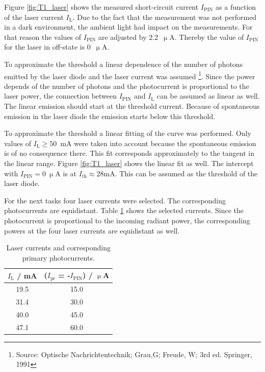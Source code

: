 Figure \ref{fig:T1_laser} shows the measured short-circuit current $I_{\mathrm{PIN}}$ as a function of the laser current $I_{\mathrm{L}}$. Due to the fact that the measurement was not performed in a dark environment, the ambient light had impact on the measurements. For that reason the values of $I_{\mathrm{PIN}}$ are adjusted by 2.2~$\upmu$A. Thereby the value of $I_{\mathrm{PIN}}$ for the laser in off-state is 0~$\upmu$A.

To approximate the threshold a linear dependence of the number of photons emitted by the laser diode and the laser current was assumed \footnote[1]{Source: Optische Nachrichtentechnik; Grau,G; Freude, W; 3rd ed. Springer, 1991}. Since the power depends of the number of photons and the photocurrent is proportional to the laser power, the connection between $I_{\mathrm{PIN}}$ and $I_{\mathrm{L}}$ can be assumed as linear as well. The linear emission should start at the threshold current. Because of spontaneous emission in the laser diode the emission starts below this threshold.

To approximate the threshold a linear fitting of the curve was performed. Only values of $I_{\mathrm{L}} \geq 50$~mA were taken into account because the spontaneous emission is of no consequence there. This fit corresponds approximately to the tangent in the linear range. Figure \ref{fig:T1_laser} shows the linear fit as well. The intercept with $I_{\mathrm{PIN}} = 0~\upmu$A is at $I_{\mathrm{th}} \approx 28$mA. This can be assumed as the threshold of the laser diode.

For the next tasks four laser currents were selected. The corresponding photocurrents are equidistant. Table \ref{tab:T1_values} shows the selected currents. Since the photocurrent is proportional to the incoming radiant power, the corresponding powers at the four laser currents are equidistant as well.


\begin{table}%
\centering
\caption{Laser currents and corresponding primary photocurrents.}

\begin{tabular}{cc}

\toprule
$I_{\mathrm{L}}$ / mA	&	($I_{\mathrm{pr}}$ = -$I_{\mathrm{PIN}}$) / $\upmu$A\\

\midrule

19.5&15.0\\
31.4&30.0\\
40.0&45.0\\
47.1&60.0\\
\bottomrule 
\end{tabular}
\label{tab:T1_values}
\end{table}

